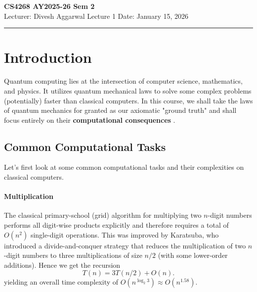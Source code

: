


% 



\newpage
\noindent
\textbf{CS4268 AY2025-26 Sem 2}
\\
\noindent
Lecturer: Divesh Aggarwal
\hfill
Lecture 1                      %
\hfill
Date: January 15, 2026          %


\noindent
\rule{\textwidth}{1pt}

\medskip


\section{Introduction}
Quantum computing lies at the intersection of computer science, mathematics, and physics. It utilizes quantum mechanical laws to solve some complex problems (potentially) faster than classical computers. In this course, we shall take the laws of quantum mechanics for granted as our axiomatic "ground truth" and shall focus entirely on their \textbf{computational consequences} \cite{NC10}.

\subsection{Common Computational Tasks}
Let's first look at some common computational tasks and their complexities on classical computers.

\paragraph{Multiplication}
The classical primary-school (grid) algorithm for multiplying two \(n\)-digit numbers performs all digit-wise products explicitly and therefore requires a total of \(O(n^{2})\) single-digit operations. This was improved by Karatsuba, who introduced a divide-and-conquer strategy that reduces the multiplication of two \(n\)-digit numbers to three multiplications of size \(n/2\) (with some lower-order additions). Hence we get the recursion
\[
        T(n) = 3T(n/2) + O(n).
\]
yielding an overall time complexity of \(O\!\left(n^{\log_{2} 3}\right) \approx O\!\left(n^{1.58}\right)\).

